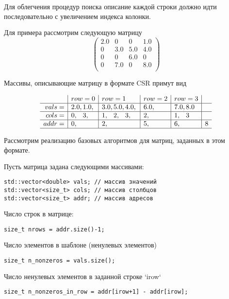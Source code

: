 Для облегчения процедур поиска описание каждой строки должно идти последовательно
с увеличением индекса колонки.

Для примера рассмотрим следующую матрицу
\begin{equation*}
\left(
\begin{array}{cccc}
2.0 & 0 & 0 & 1.0 \\
0 & 3.0 & 5.0 & 4.0 \\
0 & 0 & 6.0 & 0 \\
0 & 7.0 & 0 & 8.0 \\
\end{array}
\right)
\end{equation*}

Массивы, описывающие матрицу в формате CSR примут вид

\begin{equation*}
\begin{array}{r|l|l|l|l|l}
      & row=0     & row=1          & row=2& row=3&\\
\hline
vals= & 2.0, 1.0, & 3.0, 5.0, 4.0, & 6.0, & 7.0, 8.0 &\\
\hline
cols= & 0,\phantom{.0} 3,\phantom{.0}      & 1,\phantom{.0}2,\phantom{.0}3,\phantom{.0}          & 2,\phantom{.0}   & 1,\phantom{.0} 3     &\\
\hline
addr= & 0,        & 2,             & 5,   & 6,       & 8 \\
\hline
\end{array}
\end{equation*}

Рассмотрим реализацию базовых алгоритмов для матриц, заданных в этом формате.

Пусть матрица задана следующими массивами:
\begin{verbatim}
std::vector<double> vals; // массив значений
std::vector<size_t> cols; // массив столбцов
std::vector<size_t> addr; // массив адресов
\end{verbatim}

Число строк в матрице:
\begin{verbatim}
size_t nrows = addr.size()-1;
\end{verbatim}

Число элементов в шаблоне (ненулевых элементов)
\begin{verbatim}
size_t n_nonzeros = vals.size();
\end{verbatim}

Число ненулевых элементов в заданной строке `irow`
\begin{verbatim}
size_t n_nonzeros_in_row = addr[irow+1] - addr[irow];
\end{verbatim}

